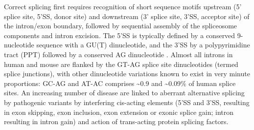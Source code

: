 Correct splicing first requires recognition of short sequence motifs upstream (5' splice site, 5'SS, donor site) and downstream (3' splice site, 3'SS, acceptor site) of the intron/exon boundary, followed by sequential assembly of the spliceosome components and intron excision\cite{Herzel2017}. The 5'SS is typically defined by a conserved 9-nucleotide sequence with a GU(T) dinucleotide, and the 3'SS by a polypyrimidine tract (PPT) followed by a conserved AG dinucleotide \cite{Will2011}. Almost all introns in human and mouse are flanked by the GT-AG splice site dinucleotides\cite{Sheth2006} (termed splice junctions), with other dinucleotide variations known to exist in very minute proportions: GC-AG and AT-AC comprises \textasciitilde0.9 and \textasciitilde0.09\% of human splice sites\cite{Parada2014}. An increasing number of disease are linked to aberrant alternative splicing by pathogenic variants by interfering cis-acting elements (5'SS and 3'SS, resulting in exon skipping, exon inclusion, exon extension or exonic splice gain; intron resulting in intron gain) and action of trans-acting protein splicing factors.



